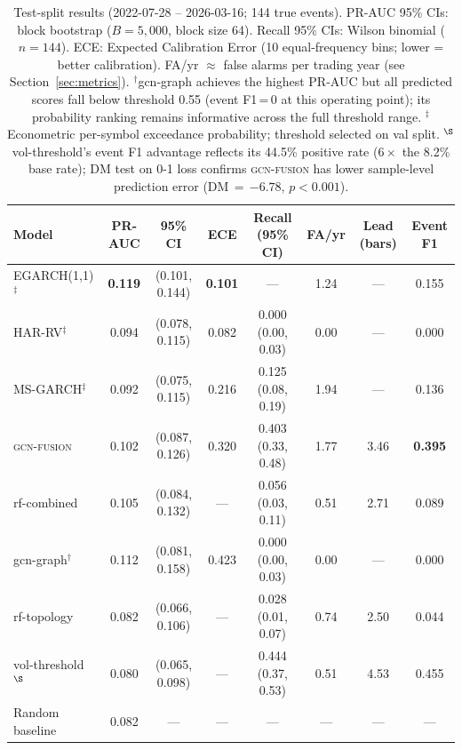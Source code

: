 \documentclass[sigconf]{acmart}
\begin{document}
\begin{table}[t]
\caption{Test-split results (2022-07-28 -- 2026-03-16; 144 true events).
PR-AUC 95\% CIs: block bootstrap ($B{=}5{,}000$, block size 64).
Recall 95\% CIs: Wilson binomial ($n{=}144$).
ECE: Expected Calibration Error (10 equal-frequency bins; lower = better calibration).
FA/yr $\approx$ false alarms per trading year (see Section~\ref{sec:metrics}).
$^\dagger$gcn-graph achieves the highest PR-AUC but all predicted scores
fall below threshold 0.55 (event F1\,=\,0 at this operating point); its
probability ranking remains informative across the full threshold range.
$^\ddagger$Econometric per-symbol exceedance probability; threshold selected
on val split.
$^\S$vol-threshold's event F1 advantage reflects its 44.5\% positive rate
($6{\times}$ the 8.2\% base rate); DM test on 0-1 loss confirms
\textsc{gcn-fusion} has lower sample-level prediction error (DM\,$=$\,$-6.78$, $p{<}0.001$).}
\label{tab:main}
\small
\begin{tabular}{@{}lccccccc@{}}
\toprule
Model & PR-AUC & 95\% CI & ECE & Recall (95\% CI) & FA/yr & Lead (bars) & Event F1 \\
\midrule
EGARCH(1,1)$^\ddagger$
  & \textbf{0.119} & (0.101, 0.144) & \textbf{0.101} & --- & 1.24 & --- & 0.155 \\
HAR-RV$^\ddagger$
  & 0.094 & (0.078, 0.115) & 0.082 & 0.000 (0.00, 0.03) & 0.00 & --- & 0.000 \\
MS-GARCH$^\ddagger$
  & 0.092 & (0.075, 0.115) & 0.216 & 0.125 (0.08, 0.19) & 1.94 & --- & 0.136 \\
\textsc{gcn-fusion}
  & 0.102 & (0.087, 0.126) & 0.320 & 0.403 (0.33, 0.48) & 1.77 & 3.46 & \textbf{0.395} \\
rf-combined
  & 0.105 & (0.084, 0.132) & --- & 0.056 (0.03, 0.11) & 0.51 & 2.71 & 0.089 \\
gcn-graph$^\dagger$
  & 0.112 & (0.081, 0.158) & 0.423 & 0.000 (0.00, 0.03) & 0.00 & --- & 0.000 \\
rf-topology
  & 0.082 & (0.066, 0.106) & --- & 0.028 (0.01, 0.07) & 0.74 & 2.50 & 0.044 \\
vol-threshold$^\S$
  & 0.080 & (0.065, 0.098) & --- & 0.444 (0.37, 0.53) & 0.51 & 4.53 & 0.455 \\
\midrule
Random baseline & 0.082 & --- & --- & --- & --- & --- & --- \\
\bottomrule
\end{tabular}
\end{table}
\end{document}
